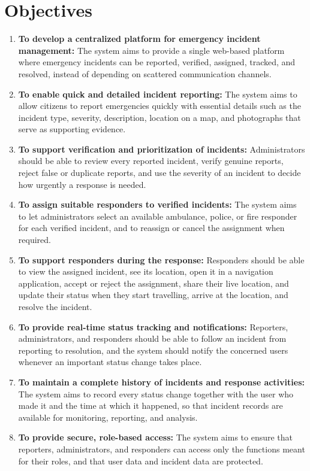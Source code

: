 \documentclass[a4paper,12pt]{report}
\begin{document}
	\section{Objectives}
	\begin{enumerate}
		\item \textbf{To develop a centralized platform for emergency incident management:}
		The system aims to provide a single web-based platform where emergency incidents can be reported, verified, assigned, tracked, and resolved, instead of depending on scattered communication channels.
		
		\item \textbf{To enable quick and detailed incident reporting:}
		The system aims to allow citizens to report emergencies quickly with essential details such as the incident type, severity, description, location on a map, and photographs that serve as supporting evidence.
		
		\item \textbf{To support verification and prioritization of incidents:}
		Administrators should be able to review every reported incident, verify genuine reports, reject false or duplicate reports, and use the severity of an incident to decide how urgently a response is needed.
		
		\item \textbf{To assign suitable responders to verified incidents:}
		The system aims to let administrators select an available ambulance, police, or fire responder for each verified incident, and to reassign or cancel the assignment when required.
		
		\item \textbf{To support responders during the response:}
		Responders should be able to view the assigned incident, see its location, open it in a navigation application, accept or reject the assignment, share their live location, and update their status when they start travelling, arrive at the location, and resolve the incident.
		
		\item \textbf{To provide real-time status tracking and notifications:}
		Reporters, administrators, and responders should be able to follow an incident from reporting to resolution, and the system should notify the concerned users whenever an important status change takes place.
		
		\item \textbf{To maintain a complete history of incidents and response activities:}
		The system aims to record every status change together with the user who made it and the time at which it happened, so that incident records are available for monitoring, reporting, and analysis.
		
		\item \textbf{To provide secure, role-based access:}
		The system aims to ensure that reporters, administrators, and responders can access only the functions meant for their roles, and that user data and incident data are protected.
	\end{enumerate}
	
\end{document}
